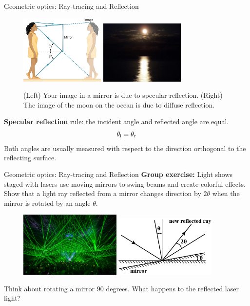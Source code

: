 \documentclass{beamer}
\begin{document}
\begin{frame}{Geometric optics: Ray-tracing and Reflection}
\begin{figure}
\includegraphics[width=0.375\textwidth]{figures/geo6.png}
\includegraphics[width=0.375\textwidth]{figures/geo2.png}
\caption{\label{fig:geo2} \footnotesize (Left) Your image in a mirror is due to specular reflection. (Right) The image of the moon on the ocean is due to diffuse reflection.}
\end{figure}
\small
\textbf{\alert{Specular reflection}} rule: the incident angle and reflected angle are equal.
\begin{equation}
\theta_{\rm i} = \theta_{\rm r}
\end{equation}
Both angles are usually measured with respect to the direction orthogonal to the reflecting surface.
\end{frame}

\begin{frame}{Geometric optics: Ray-tracing and Reflection}
\textbf{Group exercise:} Light shows staged with lasers use moving mirrors to swing beams and create colorful effects. Show that a light ray reflected from a mirror changes direction by $2\theta$ when the mirror is rotated by an angle $\theta$.
\begin{figure}
\centering
\includegraphics[width=0.45\textwidth]{figures/laserface.jpg}
\includegraphics[width=0.45\textwidth]{figures/mirror.png}
\end{figure}
\footnotesize
Think about rotating a mirror 90 degrees.  What happens to the reflected laser light?
\end{frame}
\end{document}
